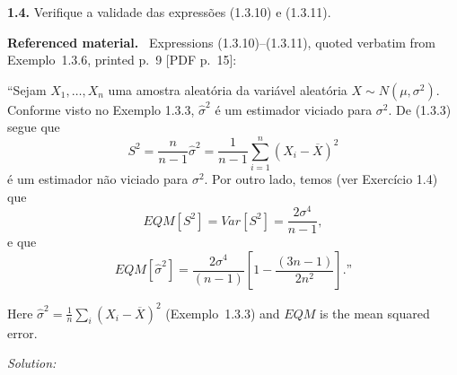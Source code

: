 \documentclass[11pt,a4paper]{article}
\newif\ifsolucoes
\newcommand{\espacoresol}{4.5cm}   %
\numberwithin{equation}{questao}   %
\newenvironment{refmat}{\par\smallskip\noindent\small\textbf{Referenced material.}\ }{\par\smallskip}
\newcommand{\resolespaco}{\ifsolucoes\else\par\textit{Solution:}\vspace{\espacoresol}\par\fi}
\begin{document}
\begin{otherlanguage}{brazil}
\textbf{1.4.} Verifique a validade das expressões (1.3.10) e (1.3.11).
\end{otherlanguage}
\begin{refmat}
Expressions (1.3.10)--(1.3.11), quoted verbatim from Exemplo~1.3.6, printed p.~9 [PDF p.~15]:
\begin{otherlanguage}{brazil}
``Sejam $X_1,\dots,X_n$ uma amostra aleatória da
variável aleatória $X\sim N(\mu,\sigma^2)$. Conforme visto no Exemplo 1.3.3, $\hat\sigma^2$ é um
estimador viciado para $\sigma^2$. De (1.3.3) segue que
\[ S^2=\frac{n}{n-1}\hat\sigma^2=\frac1{n-1}\sum_{i=1}^n(X_i-\overline X)^2 \]
é um estimador não viciado para $\sigma^2$. Por outro lado, temos (ver Exercício 1.4) que
\[ EQM[S^2]=Var[S^2]=\frac{2\sigma^4}{n-1}, \tag{1.3.10}\]
e que
\[ EQM[\hat\sigma^2]=\frac{2\sigma^4}{(n-1)}\left[1-\frac{(3n-1)}{2n^2}\right].\text{''} \tag{1.3.11}\]
\end{otherlanguage}
Here $\hat\sigma^2=\frac1n\sum_i(X_i-\overline X)^2$ (Exemplo~1.3.3) and $EQM$ is the mean squared error.
\end{refmat}
\resolespaco
\end{document}
